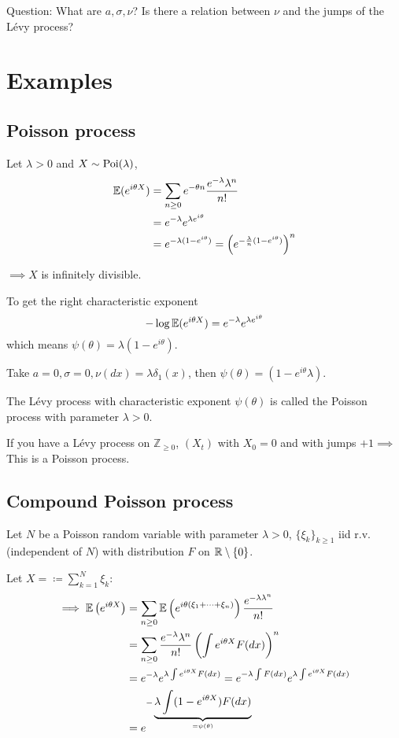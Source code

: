 

Question: What are $a,\sigma,\nu$? Is there a relation between $\nu$ and the jumps of the Lévy process?

\section{Examples}

\subsection{Poisson process}

Let $\lambda>0$ and $X\sim\text{Poi}(\lambda)$,
\begin{align*}
    \mathbb{E}(e^{i\theta X})&=\sum_{n\geq 0}e^{-\theta n}\frac{e^{-\lambda}\lambda^n}{n!}\\
    &=e^{-\lambda}e^{\lambda e^{i\theta}}\\
    &=e^{-\lambda(1-e^{i\theta})}=\left(e^{-\frac{\lambda}{n}(1-e^{i\theta})}\right)^n
\end{align*}

$\implies X$ is infinitely divisible.

To get the right characteristic exponent \[-\log\mathbb{E}(e^{i\theta X})=e^{-\lambda}e^{\lambda e^{i\theta}}\]
which means $\psi(  \theta)=\lambda(1-e^{i\theta})$.

Take $a=0,\sigma=0,\nu(dx)=\lambda\delta_1(x)$, then $\psi(\theta)=(1-e^{i\theta}\lambda)$.

The Lévy process with characteristic exponent $\psi(\theta)$ is called the Poisson process with parameter $\lambda>0$.

\begin{aremark}
    If you have a Lévy process on $\mathbb{Z}_{\geq 0}$, $(X_t)$ with $X_0=0$ and 
    with jumps $+1\implies$ This is a Poisson process.
\end{aremark}

\subsection{Compound Poisson process}

Let $N$ be a Poisson random variable with parameter $\lambda>0$, $\{\xi_k\}_{k\geq 1}$ iid r.v. (independent of $N$)
with distribution $F$ on $\mathbb{R}\setminus\{0\}$.

Let $X=\coloneqq \sum_{k=1}^N\xi_k$:
\begin{align*}
    \implies \mathbb{E}\left(e^{i\theta X}\right)&=\sum_{n\geq 0}\mathbb{E}\left(e^{i\theta(\xi_1+\dots+\xi_n)}\right)\frac{e^{-\lambda \lambda^n}}{n!}\\
    &=\sum_{n\geq 0}\frac{e^{-\lambda} \lambda^n}{n!}\left(\int e^{i\theta X}F(dx)\right)^n \\
    &=e^{-\lambda}e^{\lambda\int e^{i\theta X}F(dx)}=e^{-\lambda \int F(dx)}e^{\lambda\int e^{i\theta X}F(dx)}\\
    &=e^{-\underbrace{\lambda\int (1-e^{i\theta X})F(dx)}_{=\psi(\theta)}}
\end{align*}

